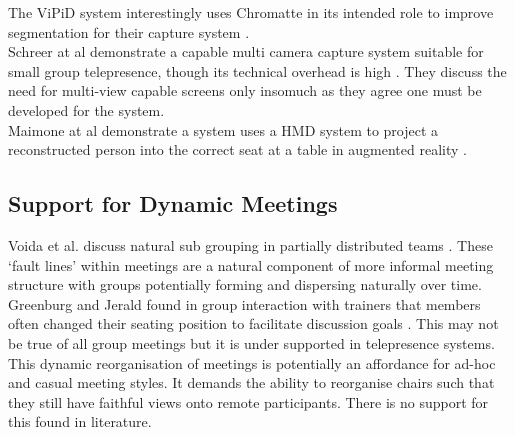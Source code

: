 The ViPiD system interestingly uses Chromatte in its intended role to improve segmentation for their capture system \cite{Klie2006}. \\
Schreer at al demonstrate a capable multi camera capture system suitable for small group telepresence, though its technical overhead is high \cite{Schreer:2008ty}. They discuss the need for multi-view capable screens only insomuch as they agree one must be developed for the system.\\
Maimone at al demonstrate a system uses a HMD system to project a reconstructed person into the correct seat at a table in augmented reality \cite{Maimone2013}.\\
                        

            

\subsection{Support for Dynamic Meetings}
Voida et al. discuss natural sub grouping in partially distributed teams \cite{Voida2012}. These `fault lines' within meetings are a natural component of more informal meeting structure with groups potentially forming and dispersing naturally over time. \\           
Greenburg and Jerald found in group interaction with trainers that members often changed their seating position to facilitate discussion goals \cite{greenberg1976role}. This may not be true of all group meetings but it is under supported in telepresence systems.\\
            This dynamic reorganisation of meetings is potentially an affordance for ad-hoc and casual meeting styles. It demands the ability to reorganise chairs such that they still have faithful views onto remote participants. There is no support for this found in literature.\\
%
